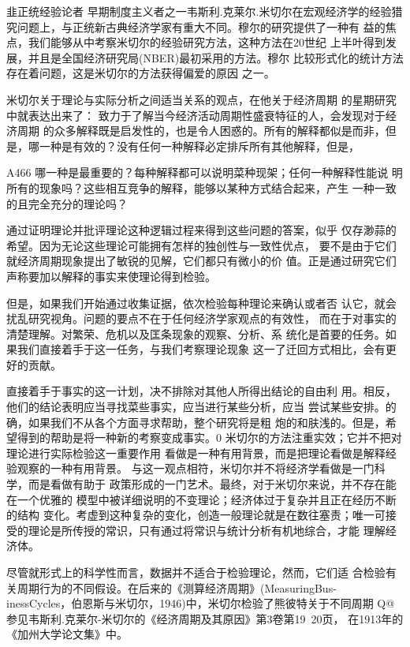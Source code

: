 韭正统经验论者
早期制度主义者之一韦斯利.克莱尔.米切尔在宏观经济学的经验猎
究问题上，与正统新古典经济学家有重大不同。穆尔的研究提供了一种有
益的焦点，我们能够从中考察米切尔的经验研究方法，这种方法在20世纪
上半叶得到发展，并且是全国经济研究局(NBER)最初采用的方法。穆尔
比较形式化的统计方法存在着问题，这是米切尔的方法获得偏爱的原因
之一。

米切尔关于理论与实际分析之间适当关系的观点，在他关于经济周期
的星期研究中就表达出来了：
致力于了解当今经济活动周期性盛衰特征的人，会发现对于经济周期
的众多解释既是启发性的，也是令人困惑的。所有的解释都似是而非，但
是，哪一种是有效的？没有任何一种解释必定排斥所有其他解释，但是，


A466
哪一种是最重要的？每种解释都可以说明菜种现架；任何一种解释性能说
明所有的现象吗？这些相互竞争的解释，能够以某种方式结合起来，产生
一种一致的且完全充分的理论吗？

通过证明理论并批评理论这种逻辑过程来得到这些问题的答案，似乎
仅存渺蒜的希望。因为无论这些理论可能拥有怎样的独创性与一致性优点，
要不是由于它们就经济周期现象提出了敏锐的见解，它们都只有微小的价
值。正是通过研究它们声称要加以解释的事实来使理论得到检验。

但是，如果我们开始通过收集证据，依次检验每种理论来确认或者否
认它，就会扰乱研究视角。问题的要点不在于任何经济学家观点的有效性，
而在于对事实的清楚理解。对繁荣、危机以及匡条现象的观察、分析、系
统化是首要的任务。如果我们直接着手于这一任务，与我们考察理论现象
这一了迁回方式相比，会有更好的贡献。

直接着手于事实的这一计划，决不排除对其他人所得出结论的自由利
用。相反，他们的结论表明应当寻找菜些事实，应当进行某些分析，应当
尝试某些安排。的确，如果我们不从各个方面寻求帮助，整个研究将是粗
炮的和肤浅的。但是，希望得到的帮助是将一种新的考察变成事实。0
米切尔的方法注重实效；它并不把对理论进行实际检验这一重要作用
看做是一种有用背景，而是把理论看做是解释经验观察的一种有用背景。
与这一观点相符，米切尔并不将经济学看做是一门科学，而是看做有助于
政策形成的一门艺术。最终，对于米切尔来说，并不存在能在一个优雅的
模型中被详细说明的不变理论；经济体过于复杂并且正在经历不断的结构
变化。考虚到这种复杂的变化，创造一般理论就是在数往塞责；唯一可接
受的理论是所传授的常识，只有通过将常识与统计分析有机地综合，才能
理解经济体。

尽管就形式上的科学性而言，数据并不适合于检验理论，然而，它们适
合检验有关周期行为的不同假设。在后来的《测算经济周期》(MeasuringBus-
inessCycles，伯恩斯与米切尔，1946)中，米切尔检验了熊彼特关于不同周期
Q@参见韦斯利.克莱尔-米切尔的《经济周期及其原因》第3卷第19~20页，
在1913年的《加州大学论文集》中。





